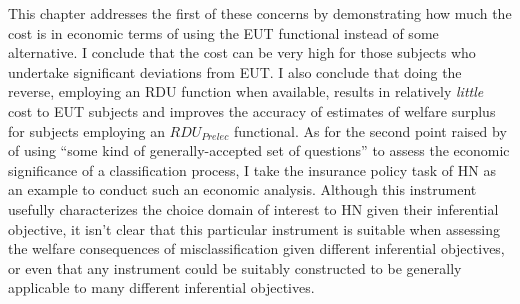 \documentclass[../main.tex]{subfiles}
\begin{document}
This chapter addresses the first of these concerns by demonstrating how much the cost is in economic terms of using the EUT functional instead of some alternative.
I conclude that the cost can be very high for those subjects who undertake significant deviations from EUT.
I also conclude that doing the reverse, employing an RDU function when available, results in relatively \textit{little} cost to EUT subjects and improves the accuracy of estimates of welfare surplus for subjects employing an $\mathit{RDU_{Prelec}}$ functional.
As for the second point raised by \textcite{Hey2001} of using \enquote{some kind of generally-accepted set of questions} to assess the economic significance of a classification process, I take the insurance policy task of HN as an example to conduct such an economic analysis.
Although this instrument usefully characterizes the choice domain of interest to HN given their inferential objective, it isn't clear that this particular instrument is suitable when assessing the welfare consequences of misclassification given different inferential objectives, or even that any instrument could be suitably constructed to be generally applicable to many different inferential objectives.


\end{document}
